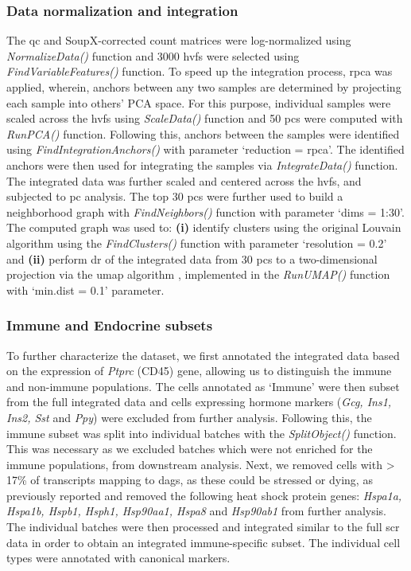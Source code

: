 \subsubsection{\large Data normalization and integration}
The \gls{qc} and SoupX-corrected count matrices were log-normalized using \textit{NormalizeData()} function and 3000 \glspl{hvf} were selected using \textit{FindVariableFeatures()} function. To speed up the integration process, \gls{rpca} was applied, wherein, anchors between any two samples are determined by projecting each sample into others’ PCA space. For this purpose, individual samples were scaled across the \glspl{hvf} using \textit{ScaleData()} function and 50 \glspl{pc} were computed with \textit{RunPCA()} function. Following this, anchors between the samples were identified using \textit{FindIntegrationAnchors()} with parameter `reduction = rpca’. The identified anchors were then used for integrating the samples via \textit{IntegrateData()} function. The integrated data was further scaled and centered across the \glspl{hvf}, and subjected to \gls{pc} analysis. The top 30 \glspl{pc} were further used to build a neighborhood graph with \textit{FindNeighbors()} function with parameter `dims = 1:30'. The computed graph was used to: \textbf{(i)} identify clusters using the original Louvain algorithm \textbf{\cite{blondel_fast_2008}} using the \textit{FindClusters()} function with parameter `resolution = 0.2' and \textbf{(ii)} perform \gls{dr} of the integrated data from 30 \glspl{pc} to a two-dimensional projection via the \gls{umap} algorithm \textbf{\cite{mcinnes_umap_2018}}, implemented in the \textit{RunUMAP()} function with `min.dist = 0.1' parameter.  


\subsubsection{\large Immune and Endocrine subsets}
\label{subsubsec:met_chp2_immuneendo}

\par To further characterize the dataset, we first annotated the integrated data based on the expression of \textit{Ptprc} (CD45) gene, allowing us to distinguish the immune and non-immune populations. The cells annotated as `Immune' were then subset from the full integrated data and cells expressing hormone markers (\textit{Gcg, Ins1, Ins2, Sst} and \textit{Ppy}) were excluded from further analysis. Following this, the immune subset was split into individual batches with the \textit{SplitObject()} function. This was necessary as we excluded batches which were not enriched for the immune populations, from downstream analysis. Next, we removed cells with > 17\% of transcripts mapping to \glspl{dag}, as these could be stressed or dying, as previously reported \textbf{\cite{oflanagan_dissociation_2019}} and removed the following heat shock protein genes: \textit{Hspa1a, Hspa1b, Hspb1, Hsph1, Hsp90aa1, Hspa8} and \textit{Hsp90ab1} from further analysis. The individual batches were then processed and integrated similar to the full \gls{scr} data in order to obtain an integrated immune-specific subset. The individual cell types were annotated with canonical markers.\\


